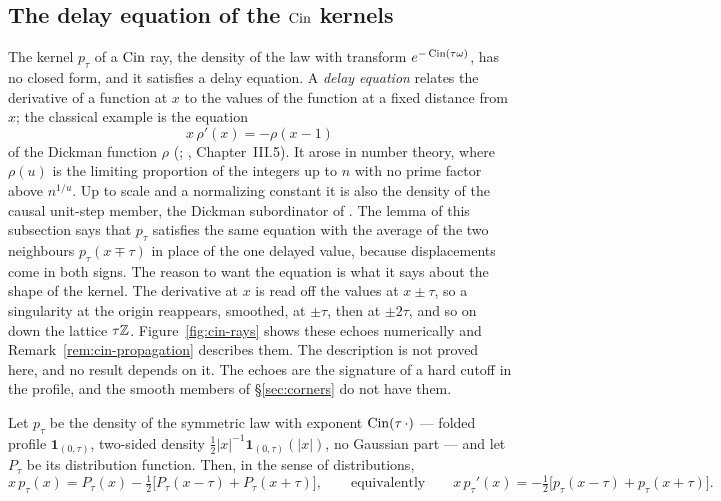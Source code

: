 \subsection{The delay equation of the \texorpdfstring{$\operatorname{Cin}$}{Cin} kernels}\label{sec:delay-equation}

The kernel $p_\tau$ of a $\operatorname{Cin}$ ray, the density of the law with transform
$e^{-\operatorname{Cin}(\tau\omega)}$, has no closed form, and it satisfies a delay equation. A \emph{delay
equation} relates the derivative of a function at $x$ to the values of the function at a
fixed distance from $x$; the classical example is the equation
\[
  x\,\rho'(x) = -\rho(x - 1)
\]
of the Dickman function $\rho$ (; ,
Chapter~III.5). It arose in number theory, where $\rho(u)$ is the limiting proportion of the
integers up to $n$ with no prime factor above $n^{1/u}$. Up to scale and a normalizing
constant it is also the density of the causal unit-step member, the Dickman subordinator of
. The lemma of this subsection says that $p_\tau$ satisfies the
same equation with the average of the two neighbours $p_\tau(x \mp \tau)$ in place of the one
delayed value, because displacements come in both signs. The reason to want the equation is
what it says about the shape of the kernel. The derivative at $x$ is read off the values at
$x \pm \tau$, so a singularity at the origin reappears, smoothed, at $\pm\tau$, then at
$\pm2\tau$, and so on down the lattice $\tau\mathbb{Z}$. Figure~\ref{fig:cin-rays} shows these echoes
numerically and Remark~\ref{rem:cin-propagation} describes them. The description is not
proved here, and no result depends on it. The echoes are the signature of a hard cutoff in
the profile, and the smooth members of \S\ref{sec:corners} do not have them.

\begin{lemma}\label{lem:cin-delay-equation}
Let $p_\tau$ be the density of the symmetric law with exponent $\operatorname{Cin}(\tau\,\cdot)$ --- folded
profile $\mathbf 1_{(0,\tau)}$, two-sided \Levy{} density
$\tfrac12|x|^{-1}\mathbf 1_{(0,\tau)}(|x|)$, no Gaussian part --- and let $P_\tau$ be its
distribution function. Then, in the sense of distributions,
\[
  x\,p_\tau(x) = P_\tau(x) - \tfrac12\bigl[P_\tau(x-\tau) + P_\tau(x+\tau)\bigr],
  \qquad\text{equivalently}\qquad
  x\,p_\tau'(x) = -\tfrac12\bigl[p_\tau(x-\tau) + p_\tau(x+\tau)\bigr].
\]
\end{lemma}

